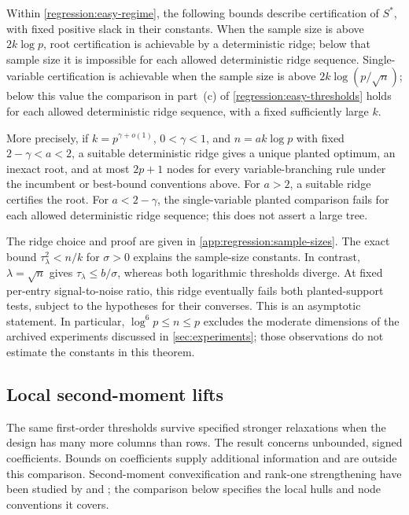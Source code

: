 \begin{corollary}
\label{regression:window}
Within \eqref{regression:easy-regime}, the following bounds describe
certification of $S^*$, with fixed positive slack in their constants.
When the sample size is above $2k\log p$, root certification is
achievable by a deterministic ridge; below that sample size it is
impossible for each allowed deterministic ridge sequence.
Single-variable certification is achievable when the sample size is above
$2k\log(p/\sqrt n)$; below this value the comparison in part~(c) of
\cref{regression:easy-thresholds} holds for each allowed deterministic
ridge sequence, with a fixed sufficiently large $k$.

More precisely, if $k=p^{\gamma+o(1)}$, $0<\gamma<1$, and
$n=a k\log p$ with fixed $2-\gamma<a<2$, a suitable deterministic
ridge gives a unique planted optimum, an inexact root, and at most
$2p+1$ nodes for every variable-branching rule under the incumbent or
best-bound conventions above. For $a>2$, a suitable ridge certifies the
root. For $a<2-\gamma$, the single-variable planted comparison fails
for each allowed deterministic ridge sequence; this does not assert a
large tree.
\end{corollary}

The ridge choice and proof are given in
\cref{app:regression:sample-sizes}. The exact bound
$\tau_\lambda^2<n/k$ for $\sigma>0$ explains the sample-size constants.
In contrast, $\lambda=\sqrt n$ gives
$\tau_\lambda\leq b/\sigma$, whereas both logarithmic thresholds diverge.
At fixed per-entry signal-to-noise ratio, this ridge eventually fails
both planted-support tests, subject to the hypotheses for their
converses. This is an asymptotic statement. In particular,
$\log^6p\leq n\leq p$ excludes the moderate dimensions of the archived
experiments discussed in \cref{sec:experiments}; those observations do
not estimate the constants in this theorem.

\subsection{Local second-moment lifts}
\label{regression:local}

The same first-order thresholds survive specified stronger relaxations
when the design has many more columns than rows. The result concerns
unbounded, signed coefficients. Bounds on coefficients supply additional
information and are outside this comparison.
Second-moment convexification and rank-one strengthening have been
studied by \citet{dongChenLinderoth2015SparseRegression} and
\citet{atamturkGomez2019RankOneConvexification}; the comparison below
specifies the local hulls and node conventions it covers.

